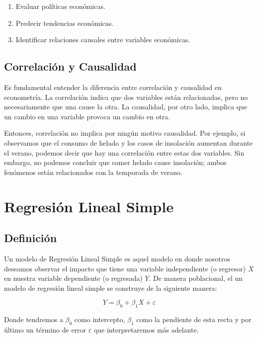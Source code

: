 \documentclass[
]{book}
\providecommand{\tightlist}{%
  \setlength{\itemsep}{0pt}\setlength{\parskip}{0pt}}
\begin{document}
\begin{enumerate}
\def\labelenumi{\arabic{enumi}.}
\tightlist
\item
  Evaluar políticas económicas.
\item
  Predecir tendencias económicas.
\item
  Identificar relaciones causales entre variables económicas.
\end{enumerate}

\section{Correlación y Causalidad}\label{correlaciuxf3n-y-causalidad}

Es fundamental entender la diferencia entre correlación y causalidad en econometría. La correlación indica que dos variables están relacionadas, pero no necesariamente que una cause la otra. La causalidad, por otro lado, implica que un cambio en una variable provoca un cambio en otra.

Entonces, correlación no implica por ningún motivo causalidad. Por ejemplo, si observamos que el consumo de helado y los casos de insolación aumentan durante el verano, podemos decir que hay una correlación entre estas dos variables. Sin embargo, no podemos concluir que comer helado cause insolación; ambos fenómenos están relacionados con la temporada de verano.

\chapter{Regresión Lineal Simple}\label{regresiuxf3n-lineal-simple}

\section{Definición}\label{definiciuxf3n}

Un modelo de Regresión Lineal Simple es aquel modelo en donde nosotros deseamos observar el impacto que tiene una variable independiente (o regresor) \(X\) en nuestra variable dependiente (o regresada) \(Y\). De manera poblacional, el un modelo de regresión lineal simple se construye de la siguiente manera:

\[
Y = \beta_0 + \beta_1X + \varepsilon
\]

Donde tendremos a \(\beta_0\) como intercepto, \(\beta_1\) como la pendiente de esta recta y por último un término de error \(\varepsilon\) que interpretaremos más adelante.
\end{document}
